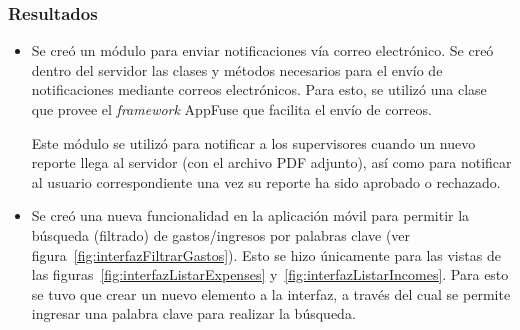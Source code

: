 \subsubsection{Resultados}
\begin{itemize}
\item Se creó un módulo para enviar notificaciones vía correo electrónico. Se creó dentro del servidor las clases y métodos necesarios para el envío de notificaciones mediante correos electrónicos. Para esto, se utilizó una clase que provee el \textit{framework} AppFuse que facilita el envío de correos. 

Este módulo se utilizó para notificar a los supervisores cuando un nuevo reporte llega al servidor (con el archivo PDF adjunto), así como para notificar al usuario correspondiente una vez su reporte ha sido aprobado o rechazado.
\item Se creó una nueva funcionalidad en la aplicación móvil para permitir la búsqueda (filtrado) de gastos/ingresos por palabras clave (ver figura~\ref{fig:interfazFiltrarGastos}). Esto se hizo únicamente para las vistas de las figuras~\ref{fig:interfazListarExpenses} y~\ref{fig:interfazListarIncomes}. Para esto se tuvo que crear un nuevo elemento a la interfaz, a través del cual se permite ingresar una palabra clave para realizar la búsqueda.
\end{itemize}
%
%
%
%
%
